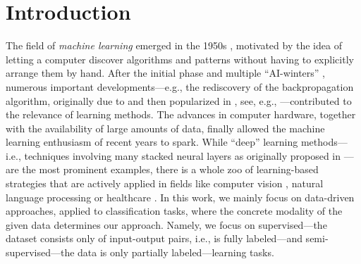 \chapter{Introduction}
%
%
The field of \textit{machine learning} emerged in the 1950s \cite{samuel1959some, rosenblatt1958perceptron}, motivated by the idea of letting a computer discover algorithms and patterns without having to explicitly arrange them by hand. After the initial phase and multiple \enquote{AI-winters} \cite{steele1996evolution}, numerous important developments---e.g., the rediscovery of the backpropagation algorithm, originally due to \cite{kelley1960gradient,rosenblatt1962principles} and then popularized in \cite{rumelhart1986learning}, see, e.g., \cite{schmidhuber2022annotated}---contributed to the relevance of learning methods. The advances in computer hardware, together with the availability of large amounts of data, finally allowed the machine learning enthusiasm of recent years to spark. While \enquote{deep} learning methods---i.e., techniques involving many stacked neural layers as originally proposed in \cite{rosenblatt1958perceptron}---are the most prominent examples, there is a whole zoo of learning-based strategies that are actively applied in fields like computer vision \cite{chai2021deep}, natural language processing \cite{khurana2023natural} or healthcare \cite{shehab2022machine}. In this work, we mainly focus on data-driven approaches, applied to classification tasks, where the concrete modality of the given data determines our approach. Namely, we focus on supervised---the dataset consists only of input-output pairs, i.e., is fully labeled---and semi-supervised---the data is only partially labeled---learning tasks.

